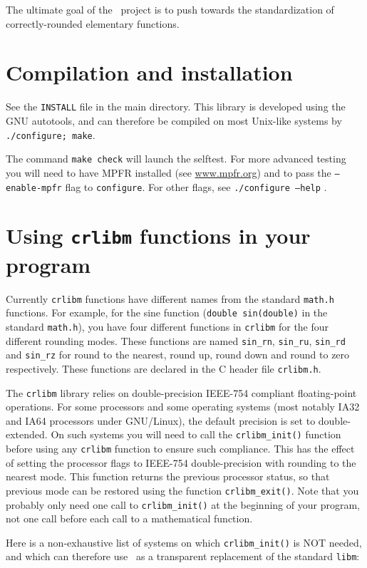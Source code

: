 The ultimate goal of the \crlibm\ project is to push towards the
standardization of correctly-rounded elementary functions.

\section{Compilation and installation}
See the \texttt{INSTALL} file in the main directory. This library is
developed using the GNU autotools, and can therefore be compiled on
most Unix-like systems by \texttt{./configure; make}. 


The command \texttt{make check} will launch the selftest.
For more advanced testing you will need to have MPFR installed (see
\url{www.mpfr.org}) and to pass the \texttt{--enable-mpfr} flag to
\texttt{configure}. For other flags, see \texttt{./configure --help} .

\section{Using \texttt{crlibm} functions in your program}

Currently \texttt{crlibm} functions have different names from the
standard \texttt{math.h} functions. For example, for the sine function
(\texttt{double sin(double)} in the standard \texttt{math.h}), you
have four different functions in \texttt{crlibm} for the four
different rounding modes. These functions are named \texttt{sin\_rn},
\texttt{sin\_ru}, \texttt{sin\_rd} and \texttt{sin\_rz} for round to the
nearest, round up, round down and round to zero respectively. These
functions are declared in the C header file \texttt{crlibm.h}.

The \texttt{crlibm} library relies on double-precision IEEE-754
compliant floating-point operations.  For some processors and some
operating systems (most notably IA32 and IA64 processors under
GNU/Linux), the default precision is set to double-extended.  On such
systems you will need to call the \texttt{crlibm\_init()} function
before using any \texttt{crlibm} function to ensure such compliance.
This has the effect of setting the processor flags to IEEE-754
double-precision with rounding to the nearest mode.  This function
returns the previous processor status, so that previous mode can be
restored using the function \texttt{crlibm\_exit()}. Note that you
probably only need one call to \texttt{crlibm\_init()} at the beginning
of your program, not one call before each call to a mathematical
function.

Here is a non-exhaustive list of systems on which
\texttt{crlibm\_init()} is NOT needed, and which can therefore use
\crlibm\ as a transparent replacement of the standard \texttt{libm}:

